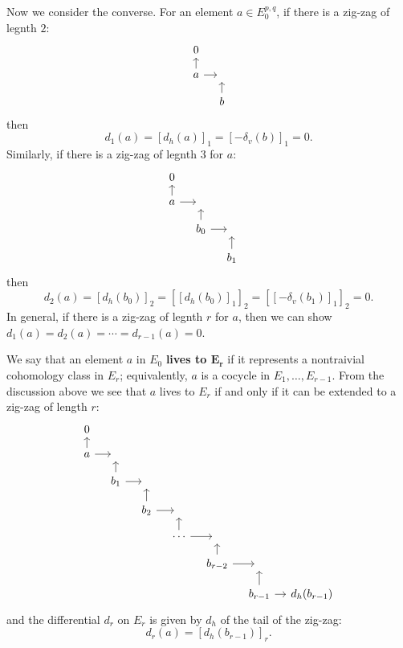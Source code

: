 \begin{remark}
Now we consider the converse. For an element $a\in E_0^{p,q}$, if there is a zig-zag of legnth $2$:
\[\begin{tikzcd}[column sep=1.0 em,row sep=1.0 em]
0&\\
a\ar[u]\ar[r]&{}\\
{}&b\ar[u]
\end{tikzcd}\]
then
\[d_1(a)=[d_h(a)]_1=[-\delta_v(b)]_1=0.\]
Similarly, if there is a zig-zag of legnth $3$ for $a$:
\[\begin{tikzcd}[column sep=1.0 em,row sep=1.0 em]
0&&&\\
a\ar[u]\ar[r]&{}&{}&\\
{}&b_0\ar[u]\ar[r]&{}&\\
{}&{}&b_1\ar[u]&
\end{tikzcd}\]
then
\[d_2(a)=[d_h(b_0)]_2=[[d_h(b_0)]_1]_2=[[-\delta_v(b_1)]_1]_2=0.\]
In general, if there is a zig-zag of legnth $r$ for $a$, then we can show $d_1(a)=d_2(a)=\cdots=d_{r-1}(a)=0$.\par
We say that an element $a$ in $E_0$ \textbf{lives to $\bm{E_r}$} if it represents a nontraivial cohomology class in $E_r$; equivalently, $a$ is a cocycle in $E_1,\dots,E_{r-1}$. From 
the discussion above we see that $a$ lives to $E_r$ if and only if it can be extended to a zig-zag of length $r$:
\[\begin{tikzcd}[column sep=1.0 em,row sep=1.0 em]
0&{}&{}&{}&{}&{}&{}\\
a\ar[u]\ar[r]&{}&{}&{}&{}&{}&{}\\
&b_1\ar[u]\ar[r]&{}&{}&{}&{}&{}\\
&&b_2\ar[u]\ar[r]&{}&{}&{}&{}\\
&&&\cdots\ar[u]\ar[r]&{}&{}&{}\\
&&&&b_{r-2}\ar[u]\ar[r]&{}&{}\\
&&&&&b_{r-1}\ar[u]\ar[r]&d_h(b_{r-1})
\end{tikzcd}\]
and the differential $d_r$ on $E_r$ is given by $d_h$ of the tail of the zig-zag:
\[d_r(a)=[d_h(b_{r-1})]_r.\]
\end{remark}
